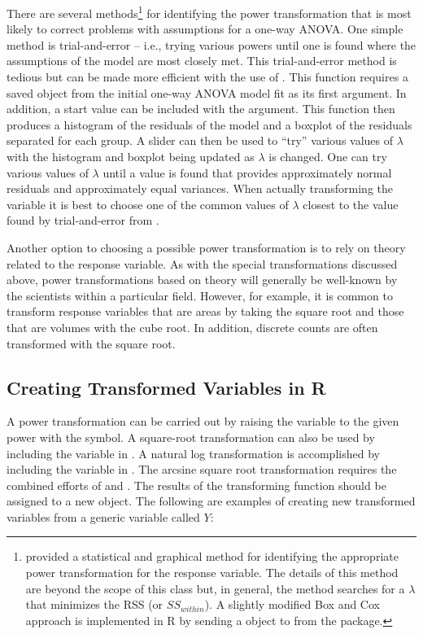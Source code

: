 \documentclass[10pt,openany]{book}\usepackage[]{graphicx}\usepackage[]{color}
\begin{document}
There are several methods\footnote{\cite{BoxCox1964} provided a statistical and graphical method for identifying the appropriate power transformation for the response variable.  The details of this method are beyond the scope of this class but, in general, the method searches for a $\lambda$ that minimizes the RSS (or $SS_{within}$).  A slightly modified Box and Cox approach is implemented in R by sending a  object to  from the  package.} for identifying the power transformation that is most likely to correct problems with assumptions for a one-way ANOVA.  One simple method is trial-and-error -- i.e., trying various powers until one is found where the assumptions of the model are most closely met.  This trial-and-error method is tedious but can be made more efficient with the use of .  This function requires a saved  object from the initial one-way ANOVA model fit as its first argument.  In addition, a start value can be included with the  argument.  This function then produces a histogram of the residuals of the model and a boxplot of the residuals separated for each group.  A slider can then be used to ``try'' various values of $\lambda$ with the histogram and boxplot being updated as $\lambda$ is changed.  One can try various values of $\lambda$ until a value is found that provides approximately normal residuals and approximately equal variances.  When actually transforming the variable it is best to choose one of the common values of $\lambda$ closest to the value found by trial-and-error from .

Another option to choosing a possible power transformation is to rely on theory related to the response variable.  As with the special transformations discussed above, power transformations based on theory will generally be well-known by the scientists within a particular field.  However, for example, it is common to transform response variables that are areas by taking the square root and those that are volumes with the cube root.  In addition, discrete counts are often transformed with the square root.


\subsection{Creating Transformed Variables in R}
A power transformation can be carried out by raising the variable to the given power with the \R{\^} symbol.  A square-root transformation can also be used by including the variable in .  A natural log transformation is accomplished by including the variable in .  The arcsine square root transformation requires the combined efforts of  and .  The results of the transforming function should be assigned to a new object.  The following are examples of creating new transformed variables from a generic variable called $Y$:
\end{document}
